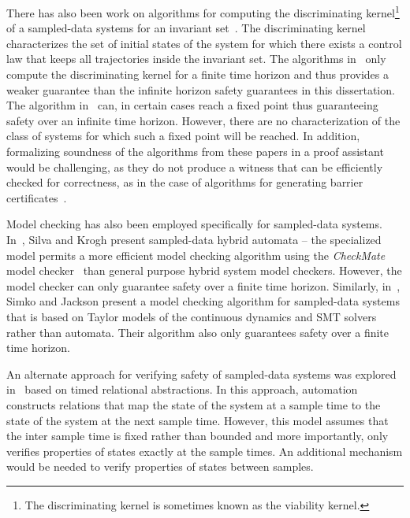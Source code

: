 There has also been work on algorithms for computing the discriminating
kernel\footnote{The discriminating kernel is sometimes known as the
  viability kernel.} of a sampled-data systems for an invariant
set~\cite{mitchell2015improved,mitchell2013safety,Gillula14sampled}. The
discriminating kernel characterizes the set of initial states of the system
for which there exists a control law that keeps all trajectories inside the
invariant set.  The algorithms
in~\cite{mitchell2015improved,Gillula14sampled} only compute the
discriminating kernel for a finite time horizon and thus provides a weaker
guarantee than the infinite horizon safety guarantees in this
dissertation. The algorithm in~\cite{mitchell2013safety} can, in certain
cases reach a fixed point thus guaranteeing safety over an infinite time
horizon. However, there are no characterization of the class of systems for
which such a fixed point will be reached. In addition, formalizing
soundness of the algorithms from these papers in a proof assistant would be
challenging, as they do not produce a witness that can be efficiently
checked for correctness, as in the case of algorithms for generating
barrier certificates~\cite{Dai17revisited,kong2013barrier,Zeng16barrier}.

Model checking has also been employed specifically for sampled-data
systems. In~\cite{silva01sampled}, Silva and Krogh present sampled-data
hybrid automata -- the specialized model permits a more efficient model
checking algorithm using the \emph{CheckMate} model
checker~\cite{silva2000modeling} than general purpose hybrid system model
checkers. However, the model checker can only guarantee safety over a
finite time horizon. Similarly, in~\cite{simko14bmc}, Simko and Jackson
present a model checking algorithm for sampled-data systems that is based
on Taylor models of the continuous dynamics and SMT solvers rather than
automata. Their algorithm also only guarantees safety over a finite time
horizon.

An alternate approach for verifying safety of sampled-data systems was
explored in~\cite{Zutshi12sampled} based on timed relational
abstractions. In this approach, automation constructs relations that map
the state of the system at a sample time to the state of the system at the
next sample time. However, this model assumes that the inter sample time is
fixed rather than bounded and more importantly, only verifies properties of
states exactly at the sample times. An additional mechanism would be needed
to verify properties of states between samples.


